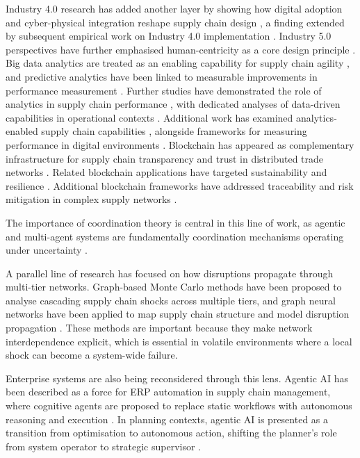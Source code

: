 Industry 4.0 research has added another layer by showing how digital adoption and cyber-physical integration reshape supply chain design \cite{Kamble2018}, a finding extended by subsequent empirical work on Industry 4.0 implementation \cite{Xu2021}. Industry 5.0 perspectives have further emphasised human-centricity as a core design principle \cite{Ivanov2023}. Big data analytics are treated as an enabling capability for supply chain agility \cite{Waller2013}, and predictive analytics have been linked to measurable improvements in performance measurement \cite{Wang2016}. Further studies have demonstrated the role of analytics in supply chain performance \cite{Kache2018}, with dedicated analyses of data-driven capabilities in operational contexts \cite{Dubey2021}. Additional work has examined analytics-enabled supply chain capabilities \cite{FossoWamba2020}, alongside frameworks for measuring performance in digital environments \cite{Frederico2020}. Blockchain has appeared as complementary infrastructure for supply chain transparency \cite{Min2019} and trust in distributed trade networks \cite{Kouhizadeh2021}. Related blockchain applications have targeted sustainability \cite{Dubey2020} and resilience \cite{Queiroz2021}. Additional blockchain frameworks have addressed traceability \cite{Leng2021} and risk mitigation in complex supply networks \cite{Saberi2019}.

The importance of coordination theory is central in this line of work, as agentic and multi-agent systems are fundamentally coordination mechanisms operating under uncertainty \cite{MaloneCrowston1994}.

A parallel line of research has focused on how disruptions propagate through multi-tier networks. Graph-based Monte Carlo methods have been proposed to analyse cascading supply chain shocks across multiple tiers, and graph neural networks have been applied to map supply chain structure and model disruption propagation \cite{KumarDesai2025}. These methods are important because they make network interdependence explicit, which is essential in volatile environments where a local shock can become a system-wide failure.

Enterprise systems are also being reconsidered through this lens. Agentic AI has been described as a force for ERP automation in supply chain management, where cognitive agents are proposed to replace static workflows with autonomous reasoning and execution \cite{Joshi2025}. In planning contexts, agentic AI is presented as a transition from optimisation to autonomous action, shifting the planner's role from system operator to strategic supervisor \cite{Ganesan2025}.

